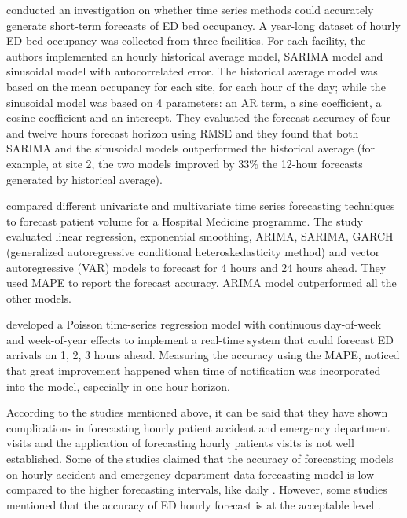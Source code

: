 \documentclass[]{elsarticle} %
\begin{document}
\citet{schweigler2009forecasting} conducted an investigation on whether time series methods could accurately generate short-term forecasts of ED bed occupancy. A year-long dataset of hourly ED bed occupancy was collected from three facilities. For each facility, the authors implemented an hourly historical average model, SARIMA model and sinusoidal model with autocorrelated error. The historical average model was based on the mean occupancy for each site, for each hour of the day; while the sinusoidal model was based on 4 parameters: an AR term, a sine coefficient, a cosine coefficient and an intercept. They evaluated the forecast accuracy of four and twelve hours forecast horizon using RMSE and they found that both SARIMA and the sinusoidal models outperformed the historical average (for example, at site 2, the two models improved by \(33\%\) the 12-hour forecasts generated by historical average).

\citet{kim2014predicting} compared different univariate and multivariate time series forecasting techniques to forecast patient volume for a Hospital Medicine programme. The study evaluated linear regression, exponential smoothing, ARIMA, SARIMA, GARCH (generalized autoregressive conditional heteroskedasticity method) and vector autoregressive (VAR) models to forecast for 4 hours and 24 hours ahead. They used MAPE to report the forecast accuracy. ARIMA model outperformed all the other models.

\citet{asheim2019real} developed a Poisson time-series regression model with continuous day-of-week and week-of-year effects to implement a real-time system that could forecast ED arrivals on 1, 2, 3 hours ahead. Measuring the accuracy using the MAPE, \citet{asheim2019real} noticed that great improvement happened when time of notification was incorporated into the model, especially in one-hour horizon.

According to the studies mentioned above, it can be said that they have shown complications in forecasting hourly patient accident and emergency department visits and the application of forecasting hourly patients visits is not well established. Some of the studies claimed that the accuracy of forecasting models on hourly accident and emergency department data forecasting model is low compared to the higher forecasting intervals, like daily \citep{boyle2012predicting, hertzum2017forecasting}. However, some studies mentioned that the accuracy of ED hourly forecast is at the acceptable level \citep{choudhury2020forecasting, mccarthy2008challenge, schweigler2009forecasting}.
\end{document}
